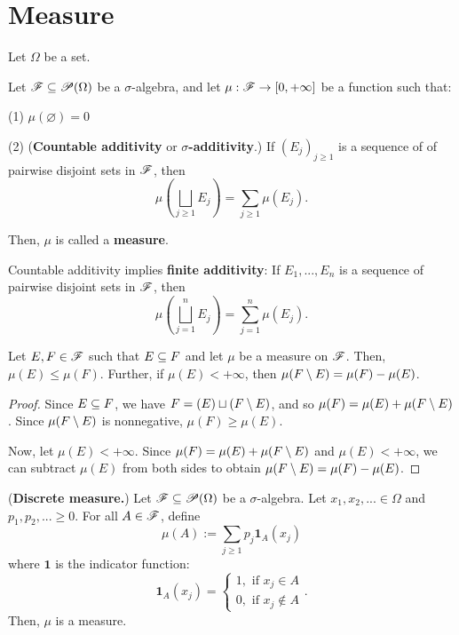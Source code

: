 \section{Measure}

Let $\Omega$ be a set. 

\begin{definition}
  Let $\mathscr{F} \subseteq \mathscr{P}(\Omega)$ be a $\sigma$-algebra, and let $\mu : \mathscr{F} \to [0, +\infty]$ be a function such that:
  
  (1) $\mu(\varnothing) = 0$
  
  (2) (\textbf{Countable additivity} or \textbf{$\sigma$-additivity}.) If $(E_j)_{j \geq 1}$ is a sequence of of pairwise disjoint sets in $\mathscr{F}$, then
  \[
  \mu \left( \bigsqcup_{j \geq 1} E_j \right) = \sum_{j \geq 1} \mu(E_j).
  \]

  Then, $\mu$ is called a \textbf{measure}.
\end{definition}

Countable additivity implies \textbf{finite additivity}: If $E_1,...,E_n$ is a sequence of pairwise disjoint sets in $\mathscr{F}$, then
\[
\mu \left( \bigsqcup_{j = 1}^n E_j \right) = \sum_{j = 1}^n \mu(E_j).
\]

\begin{proposition}
  Let $E, F \in \mathscr{F}$ such that $E \subseteq F$ and let $\mu$ be a measure on $\mathscr{F}$. Then, $\mu(E) \leq \mu(F)$. Further, if $\mu(E) < +\infty$, then $\mu(F \setminus E) = \mu(F) - \mu(E)$. 
\end{proposition}
\begin{proof}
  Since $E \subseteq F$, we have $F = (E) \sqcup (F \setminus E)$, and so $\mu(F) = \mu(E) + \mu(F \setminus E)$. Since $\mu(F \setminus E)$ is nonnegative, $\mu(F) \geq \mu(E)$. 

  Now, let $\mu(E) < +\infty$. Since $\mu(F) = \mu(E) + \mu(F \setminus E)$ and $\mu(E) < + \infty$, we can subtract $\mu(E)$ from both sides to obtain $\mu(F \setminus E) = \mu(F) - \mu(E)$. 
\end{proof}

\begin{example}
  (\textbf{Discrete measure.}) Let $\mathscr{F} \subseteq \mathscr{P}(\Omega)$ be a $\sigma$-algebra. Let $x_1, x_2,... \in \Omega$ and $p_1, p_2, ... \geq 0$. For all $A \in \mathscr{F}$, define
  \[
  \mu(A) := \sum_{j \geq 1} p_j \mathbf{1}_A(x_j)
  \]
  where $\mathbf{1}$ is the indicator function: 
  \[
  \mathbf{1}_A(x_j) =
  \begin{cases}
    1, \text{ if } x_j \in A \\
    0, \text{ if } x_j \not\in A 
  \end{cases}.
  \]
  Then, $\mu$ is a measure. 
\end{example}

